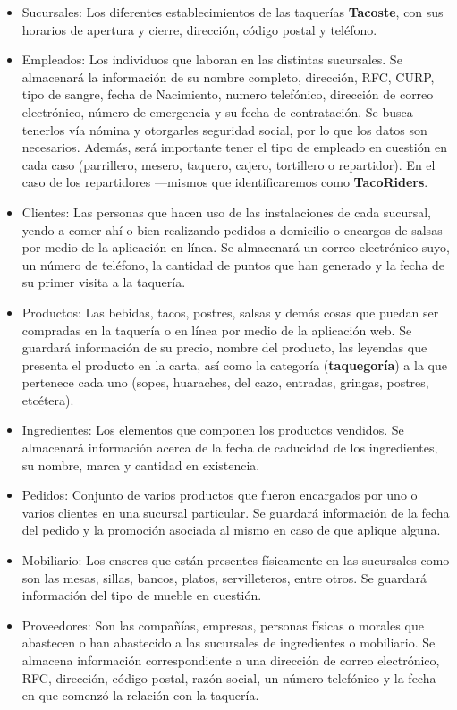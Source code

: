 \documentclass[11pt,letterpaper]{article}
\begin{document}
\begin{itemize}
\item Sucursales: Los diferentes establecimientos de las taquerías \textbf{Tacoste}, con sus horarios de apertura y cierre, dirección, código postal y teléfono.
\item Empleados: Los individuos que laboran en las distintas sucursales. Se almacenará la información de su nombre completo, dirección, RFC, CURP, tipo de sangre, fecha de Nacimiento, numero telefónico, dirección de correo electrónico, número de emergencia y su fecha de contratación. Se busca tenerlos vía nómina y otorgarles seguridad social, por lo que los datos son necesarios. Además, será importante tener el tipo de empleado en cuestión en cada caso (parrillero, mesero, taquero, cajero, tortillero o repartidor). En el caso de los repartidores ---mismos que identificaremos como \textbf{TacoRiders}.
\item Clientes: Las personas que hacen uso de las instalaciones de cada sucursal, yendo a comer ahí o bien realizando pedidos a domicilio o encargos de salsas por medio de la aplicación en línea. Se almacenará un correo electrónico suyo, un número de teléfono, la cantidad de puntos que han generado y la fecha de su primer visita a la taquería.
\item Productos: Las bebidas, tacos, postres, salsas y demás cosas que puedan ser compradas en la taquería o en línea por medio de la aplicación web. Se guardará información de su precio, nombre del producto, las leyendas que presenta el producto en la carta, así como la categoría (\textbf{taquegoría}) a la que pertenece cada uno (sopes, huaraches, del cazo, entradas, gringas, postres, etcétera). 
\item Ingredientes: Los elementos que componen los productos vendidos. Se almacenará información acerca de la fecha de caducidad de los ingredientes, su nombre, marca y cantidad en existencia.
\item Pedidos: Conjunto de varios productos que fueron encargados por uno o varios clientes en una sucursal particular. Se guardará información de la fecha del pedido y la promoción asociada al mismo en caso de que aplique alguna.
\item Mobiliario: Los enseres que están presentes físicamente en las sucursales como son las mesas, sillas, bancos, platos, servilleteros, entre otros. Se guardará información del tipo de mueble en cuestión.
\item Proveedores: Son las compañías, empresas, personas físicas o morales que abastecen o han abastecido a las sucursales de ingredientes o mobiliario. Se almacena información correspondiente a una dirección de correo electrónico, RFC, dirección, código postal, razón social, un número telefónico y la fecha en que comenzó la relación con la taquería.
\end{itemize}
\end{document}
